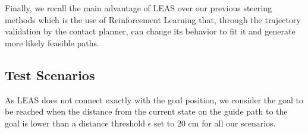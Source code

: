 \hfill

Finally, we recall the main advantage of LEAS over our previous steering methods which is the use of Reinforcement Learning that, through the trajectory validation by the contact planner, can change its behavior to fit it and generate more likely feasible paths.

\subsection{Test Scenarios\label{subsub:leas:test_scenarios}}

As LEAS does not connect exactly with the goal position, we consider the goal to be reached when the distance from the current state on the guide path to the goal is lower than a distance threshold $\epsilon$ set to $20$ cm for all our scenarios.


